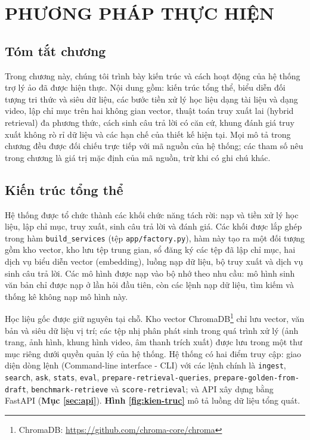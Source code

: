 \chapter{PHƯƠNG PHÁP THỰC HIỆN}
\label{Chapter3}

\section*{Tóm tắt chương}

Trong chương này, chúng tôi trình bày kiến trúc và cách hoạt động của hệ thống trợ lý ảo đã được hiện thực. Nội dung gồm: kiến trúc tổng thể, biểu diễn đối tượng tri thức và siêu dữ liệu, các bước tiền xử lý học liệu dạng tài liệu và dạng video, lập chỉ mục trên hai không gian vector, thuật toán truy xuất lai (hybrid retrieval) đa phương thức, cách sinh câu trả lời có căn cứ, khung đánh giá truy xuất không rò rỉ dữ liệu và các hạn chế của thiết kế hiện tại. Mọi mô tả trong chương đều được đối chiếu trực tiếp với mã nguồn của hệ thống; các tham số nêu trong chương là giá trị mặc định của mã nguồn, trừ khi có ghi chú khác.


\section{Kiến trúc tổng thể}\label{sec:kien-truc}

Hệ thống được tổ chức thành các khối chức năng tách rời: nạp và tiền xử lý học liệu, lập chỉ mục, truy xuất, sinh câu trả lời và đánh giá. Các khối được lắp ghép trong hàm \texttt{build\_services} (tệp \texttt{app/factory.py}), hàm này tạo ra một đối tượng gồm kho vector, kho lưu tệp trung gian, sổ đăng ký các tệp đã lập chỉ mục, hai dịch vụ biểu diễn vector (embedding), luồng nạp dữ liệu, bộ truy xuất và dịch vụ sinh câu trả lời. Các mô hình được nạp vào bộ nhớ theo nhu cầu: mô hình sinh văn bản chỉ được nạp ở lần hỏi đầu tiên, còn các lệnh nạp dữ liệu, tìm kiếm và thống kê không nạp mô hình này.

\bigbreak\noindent
Học liệu gốc được giữ nguyên tại chỗ. Kho vector ChromaDB\footnote{ChromaDB: \url{https://github.com/chroma-core/chroma}} chỉ lưu vector, văn bản và siêu dữ liệu vị trí; các tệp nhị phân phát sinh trong quá trình xử lý (ảnh trang, ảnh hình, khung hình video, âm thanh trích xuất) được lưu trong một thư mục riêng dưới quyền quản lý của hệ thống. Hệ thống có hai điểm truy cập: giao diện dòng lệnh (Command-line interface - CLI) với các lệnh chính là \texttt{ingest}, \texttt{search}, \texttt{ask}, \texttt{stats}, \texttt{eval}, \texttt{prepare-retrieval-queries}, \texttt{prepare-golden-from-draft}, \texttt{benchmark-retrieve} và \texttt{score-retrieval}; và API xây dựng bằng FastAPI (\textbf{Mục \ref{sec:api}}). \textbf{Hình \ref{fig:kien-truc}} mô tả luồng dữ liệu tổng quát.

